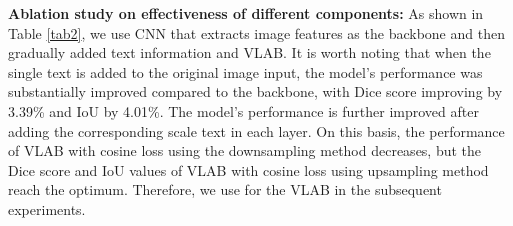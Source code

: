 \documentclass{article}
\begin{document}
\begin{table}[!ht]
\centering
\caption{Ablation study on effectiveness of different components on QaTa-COVID dataset.}
\label{tab2}
\vspace{-2mm}
\end{table}

\noindent\textbf{Ablation study on effectiveness of different components: } As shown in Table \ref{tab2}, we use CNN that extracts image features as the backbone and then gradually added text information and VLAB. It is worth noting that when the single text is added to the original image input, the model's performance was substantially improved compared to the backbone, with Dice score improving by 3.39\% and IoU by 4.01\%. The model's performance is further improved after adding the corresponding scale text in each layer. On this basis, the performance of VLAB with cosine loss using the downsampling method decreases, but the Dice score and IoU values of VLAB with cosine loss using upsampling method reach the optimum. Therefore, we use  for the VLAB in the subsequent experiments.
\vspace{-4mm}
\end{document}
